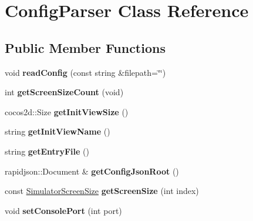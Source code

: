 \hypertarget{classConfigParser}{}\section{Config\+Parser Class Reference}
\label{classConfigParser}
\subsection*{Public Member Functions}
\begin{DoxyCompactItemize}
\item 
\mbox{\label{classConfigParser_a8e039f9eb5e7d500972739c21741af6d}} 
void {\bfseries read\+Config} (const string \&filepath=\char`\"{}\char`\"{})
\item 
\mbox{\label{classConfigParser_aada01662f9c5d2dbc86200d2e0fea34e}} 
int {\bfseries get\+Screen\+Size\+Count} (void)
\item 
\mbox{\label{classConfigParser_a8ca5579716f3fbb95d85100d60f475c7}} 
cocos2d\+::\+Size {\bfseries get\+Init\+View\+Size} ()
\item 
\mbox{\label{classConfigParser_a6d496d9a89cafeff2213c2c641c1e154}} 
string {\bfseries get\+Init\+View\+Name} ()
\item 
\mbox{\label{classConfigParser_aa1836e27e232e48f26758bb939b2c90a}} 
string {\bfseries get\+Entry\+File} ()
\item 
\mbox{\label{classConfigParser_a32e2fd263963197a0a77db117f02cb83}} 
rapidjson\+::\+Document \& {\bfseries get\+Config\+Json\+Root} ()
\item 
\mbox{\label{classConfigParser_abdf4e38c4e1465ad26bbe4634b944300}} 
const \hyperlink{struct__SimulatorScreenSize}{Simulator\+Screen\+Size} {\bfseries get\+Screen\+Size} (int index)
\item 
\mbox{\label{classConfigParser_ad9f42463a14c45d88b9e80c563baa538}} 
void {\bfseries set\+Console\+Port} (int port)
\item 
\mbox{\label{classConfigParser_a7be5f9dd18fb0bc080c183afaa7f49e4}} 

\end{DoxyCompactItemize}

